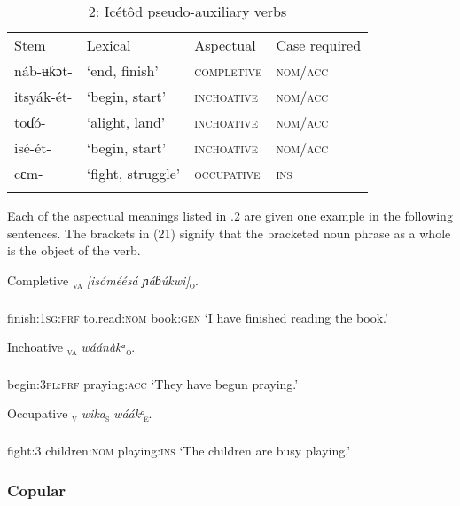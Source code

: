 \begin{table}
\caption{2: Icétôd pseudo-auxiliary verbs}
\label{tab:10}


\begin{tabularx}{\textwidth}{XXXX}
\lsptoprule

Stem & Lexical & Aspectual & Case required\\
náb-ʉƙɔt- & ‘end, finish’ & \textsc{completive} & \textsc{nom/acc}\\
itsyák-ét- & ‘begin, start’ & \textsc{inchoative} & \textsc{nom/acc}\\
toɗó- & ‘alight, land’ & \textsc{inchoative} & \textsc{nom/acc}\\
isé-ét- & ‘begin, start’ & \textsc{inchoative} & \textsc{nom/acc}\\
cɛm- & ‘fight, struggle’ & \textsc{occupative} & \textsc{ins}\\
\lspbottomrule
\end{tabularx}
\end{table}
Each of the aspectual meanings listed in .2 are given one example in the following sentences. The brackets in (21) signify that the bracketed noun phrase as a whole is the object of the verb.



Completive
\ea\label{ex:}
\textsc{\textsubscript{va}}\textit{    [isóméésá   ɲáɓúkwi]}\textsc{\textsubscript{o}}. \\
    \\
finish:\textsc{1sg:prf}   to.read:\textsc{nom}   book:\textsc{gen}
\glt ‘I have finished reading the book.’ 
\z




Inchoative
\ea\label{ex:}
\textsc{\textsubscript{va}}\textit{  wáánàkᵃ}\textsc{\textsubscript{o}}. \\
    \\
begin:\textsc{3pl:prf}   praying:\textsc{acc}
\glt ‘They have begun praying.’ 
\z




Occupative
\ea\label{ex:}
\textsc{\textsubscript{v}}  \textit{  wika}\textsc{\textsubscript{s}}\textit{       wáákᵒ}\textsc{\textsubscript{e}}. \\
    \\
fight:3   children:\textsc{nom}   playing:\textsc{ins}
\glt ‘The children are busy playing.’ 
\z




\subsubsection{Copular}

